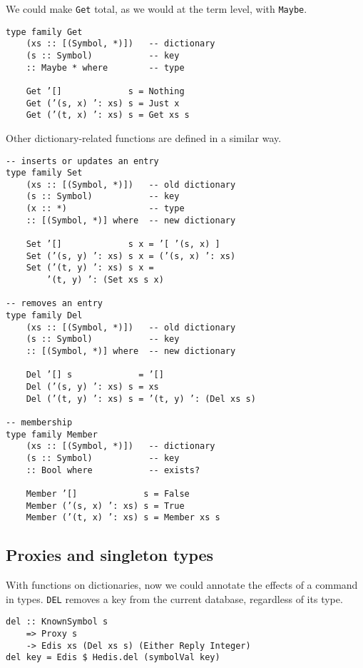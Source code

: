 \documentclass[pldi]{sigplanconf-pldi16}
\begin{document}
We could make \texttt{Get} total, as we would at the term level,
with \texttt{Maybe}.

\begin{verbatim}
type family Get
    (xs :: [(Symbol, *)])   -- dictionary
    (s :: Symbol)           -- key
    :: Maybe * where        -- type

    Get ’[]             s = Nothing
    Get (’(s, x) ’: xs) s = Just x
    Get (’(t, x) ’: xs) s = Get xs s
\end{verbatim}

Other dictionary-related functions are defined in a similar way.

\begin{verbatim}
-- inserts or updates an entry
type family Set
    (xs :: [(Symbol, *)])   -- old dictionary
    (s :: Symbol)           -- key
    (x :: *)                -- type
    :: [(Symbol, *)] where  -- new dictionary

    Set ’[]             s x = ’[ ’(s, x) ]
    Set (’(s, y) ’: xs) s x = (’(s, x) ’: xs)
    Set (’(t, y) ’: xs) s x =
        ’(t, y) ’: (Set xs s x)

-- removes an entry
type family Del
    (xs :: [(Symbol, *)])   -- old dictionary
    (s :: Symbol)           -- key
    :: [(Symbol, *)] where  -- new dictionary

    Del ’[] s             = ’[]
    Del (’(s, y) ’: xs) s = xs
    Del (’(t, y) ’: xs) s = ’(t, y) ’: (Del xs s)

-- membership
type family Member
    (xs :: [(Symbol, *)])   -- dictionary
    (s :: Symbol)           -- key
    :: Bool where           -- exists?

    Member ’[]             s = False
    Member (’(s, x) ’: xs) s = True
    Member (’(t, x) ’: xs) s = Member xs s
\end{verbatim}

\subsection{Proxies and singleton types}

With functions on dictionaries, now we could annotate the effects of a command
in types. \texttt{DEL} removes a key from the current database,
regardless of its type.

\begin{verbatim}
del :: KnownSymbol s
    => Proxy s
    -> Edis xs (Del xs s) (Either Reply Integer)
del key = Edis $ Hedis.del (symbolVal key)
\end{verbatim}
\end{document}
